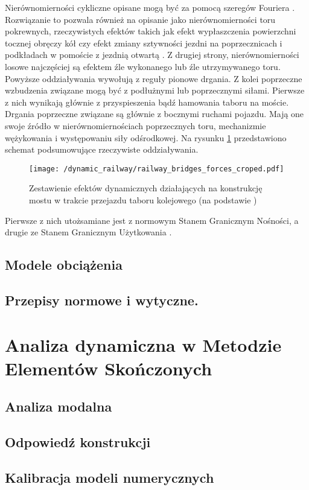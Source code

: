 Nierównomierności cykliczne opisane mogą być za pomocą szeregów Fouriera \parencite{Ladislav1996}. Rozwiązanie to pozwala również na opisanie jako nierównomierności toru pokrewnych, rzeczywistych efektów takich jak efekt wypłaszczenia powierzchni tocznej obręczy kół \parencite{Zhou2020} czy efekt zmiany sztywności jezdni na poprzecznicach i podkładach w pomoście z jezdnią otwartą \parencite{Fryba1999}. Z drugiej strony, nierównomierności losowe najczęściej są efektem źle wykonanego lub źle utrzymywanego toru. Powyższe oddziaływania wywołują z reguły pionowe drgania. Z kolei poprzeczne wzbudzenia związane mogą być z podłużnymi lub poprzecznymi siłami. Pierwsze z nich wynikają głównie z przyspieszenia bądź hamowania taboru na moście. Drgania poprzeczne związane są głównie z bocznymi ruchami pojazdu. Mają one swoje źródło w nierównomiernościach poprzecznych toru, mechanizmie wężykowania \parencite{Babe2016} i występowaniu siły odśrodkowej. Na rysunku \ref{fig:railway_dynamic_forces} przedstawiono schemat podsumowujące rzeczywiste oddziaływania.
\begin{figure}[h]
	\centering
	\texttt{[image: /dynamic\_railway/railway\_bridges\_forces\_croped.pdf]} 
	\captionsetup{justification=centering}
	\caption{Zestawienie efektów dynamicznych działających na konstrukcję mostu w trakcie przejazdu taboru kolejowego (na podstawie \parencite{Ladislav1996})}
	\label{fig:railway_dynamic_forces}
\end{figure}


Pierwsze z nich utożsamiane jest z normowym Stanem Granicznym Nośności, a drugie ze Stanem Granicznym Użytkowania \parencite{PolskiKomitetNormalizacyjny2004}. 






\subsection{Modele obciążenia}
\subsection{Przepisy normowe i wytyczne.}
\section{Analiza dynamiczna w Metodzie Elementów Skończonych}
\subsection{Analiza modalna}
\subsection{Odpowiedź konstrukcji}
\subsection{Kalibracja modeli numerycznych}

